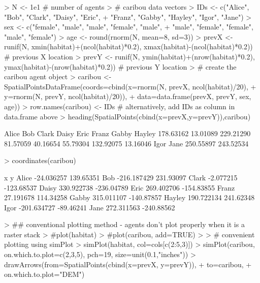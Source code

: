 \documentclass{article}
\begin{document}
\begin{Schunk}
\begin{Sinput}
> N <- 1e1 # number of agents
> # caribou data vectors
> IDs <- c("Alice", "Bob", "Clark", "Daisy", "Eric",
+          "Franz", "Gabby", "Hayley", "Igor", "Jane")
> sex <- c("female", "male", "male", "female", "male",
+          "male", "female", "female", "male", "female")
> age <- round(rnorm(N, mean=8, sd=3))
> prevX <- runif(N, xmin(habitat)+(ncol(habitat)*0.2), xmax(habitat)-(ncol(habitat)*0.2)) # previous X location
> prevY <- runif(N, ymin(habitat)+(nrow(habitat)*0.2), ymax(habitat)-(nrow(habitat)*0.2)) # previous Y location
> # create the caribou agent object
> caribou <- SpatialPointsDataFrame(coords=cbind(x=rnorm(N, prevX, ncol(habitat)/20),
+                                                y=rnorm(N, prevY, ncol(habitat)/20)),
+                                   data=data.frame(prevX, prevY, sex, age))
> row.names(caribou) <- IDs # alternatively, add IDs as column in data.frame above
> heading(SpatialPoints(cbind(x=prevX,y=prevY)),caribou)
\end{Sinput}
\begin{Soutput}
    Alice       Bob     Clark     Daisy      Eric     Franz     Gabby    Hayley 
178.63162  13.01089 229.21290  81.57059  40.16654  55.79304 132.92075  13.16046 
     Igor      Jane 
250.55897 243.52534 
\end{Soutput}
\begin{Sinput}
> coordinates(caribou)
\end{Sinput}
\begin{Soutput}
                 x          y
Alice   -24.036257  139.65351
Bob    -216.187429  231.93097
Clark    -2.077215 -123.68537
Daisy   330.922738 -236.04789
Eric    269.402706 -154.83855
Franz    27.191678  114.34258
Gabby   315.011107 -140.87857
Hayley  190.722134  241.62348
Igor   -201.634727  -89.46241
Jane    272.311563 -240.88562
\end{Soutput}
\begin{Sinput}
> ## conventional plotting method - agents don't plot properly when it is a raster stack
> #plot(habitat)
> #plot(caribou, add=TRUE)
> 
> # convenient plotting using simPlot
> simPlot(habitat, col=cols[c(2:5,3)])
> simPlot(caribou, on.which.to.plot=c(2,3,5), pch=19, size=unit(0.1,"inches"))
> drawArrows(from=SpatialPoints(cbind(x=prevX, y=prevY)),
+            to=caribou,
+            on.which.to.plot="DEM")
\end{Sinput}
\end{Schunk}
\end{document}
